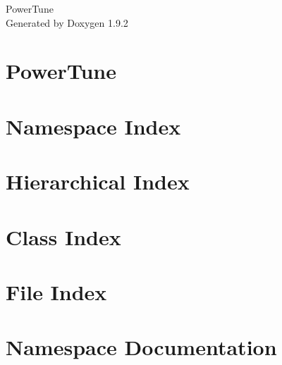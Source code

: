 \documentclass[twoside]{book}
\newcommand{\+}{\discretionary{\mbox{\scriptsize$\hookleftarrow$}}{}{}}
\newcommand{\clearemptydoublepage}{%
    \newpage{\pagestyle{empty}\cleardoublepage}%
  }
\begin{document}
  \raggedbottom
    \hypersetup{pageanchor=false,
                bookmarksnumbered=true,
                pdfencoding=unicode
               }
  \begin{titlepage}
  \vspace*{7cm}
  \begin{center}%
  {\Large Power\+Tune}\\
  \vspace*{1cm}
  {\large Generated by Doxygen 1.9.2}\\
  \end{center}
  \end{titlepage}
  \clearemptydoublepage
  \tableofcontents
  \clearemptydoublepage
  \hypersetup{pageanchor=true}
\chapter{Power\+Tune}
\label{md_README}

\chapter{Namespace Index}

\chapter{Hierarchical Index}

\chapter{Class Index}

\chapter{File Index}

\chapter{Namespace Documentation}


\end{document}
